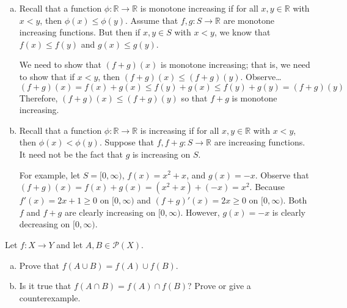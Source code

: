 \documentclass[11pt,letterpaper]{article}
\begin{document}
\sol 
\begin{enumerate}[(a)]
\item Recall that a function $\phi: \mathbb{R} \to \mathbb{R}$ is monotone increasing if for all $x, y \in \mathbb{R}$ with $x < y$, then $\phi(x) \leq \phi(y)$. Assume that $f, g: S \to \mathbb{R}$ are monotone increasing functions. But then if $x, y \in S$ with $x < y$, we know that $f(x) \leq f(y)$ and $g(x) \leq g(y)$. \pspace

We need to show that $(f + g)(x)$ is monotone increasing; that is, we need to show that if $x < y$, then $(f + g)(x) \leq (f + g)(y)$. Observe\dots
	\[
	(f + g)(x)= f(x) + g(x) \leq f(y) + g(x) \leq f(y) + g(y)= (f + g)(y) 
	\]
Therefore, $(f + g)(x) \leq (f + g)(y)$ so that $f + g$ is monotone increasing. \pspace

\item Recall that a function $\phi: \mathbb{R} \to \mathbb{R}$ is increasing if for all $x, y \in \mathbb{R}$ with $x < y$, then $\phi(x) < \phi(y)$. Suppose that $f, f + g: S \to \mathbb{R}$ are increasing functions. It need not be the fact that $g$ is increasing on $S$. \pspace

For example, let $S= [0, \infty)$, $f(x)= x^2 + x$, and $g(x)= -x$. Observe that $(f + g)(x)= f(x) + g(x)= (x^2 + x) + (-x)= x^2$. Because $f'(x)= 2x + 1 \geq 0$ on $[0, \infty)$ and $(f + g)'(x)= 2x \geq 0$ on $[0, \infty)$. Both $f$ and $f + g$ are clearly increasing on $[0, \infty)$. However, $g(x)= -x$ is clearly decreasing on $[0, \infty)$. 
\end{enumerate}



\newpage



 Let $f: X \to Y$ and let $A, B \in \mathcal{P}(X)$. 
        \begin{enumerate}[(a)]
        \item Prove that $f(A \cup B)= f(A) \cup f(B)$. 
        \item Is it true that $f(A \cap B)= f(A) \cap f(B)$? Prove or give a counterexample. 
        \end{enumerate} \pspace
\end{document}
